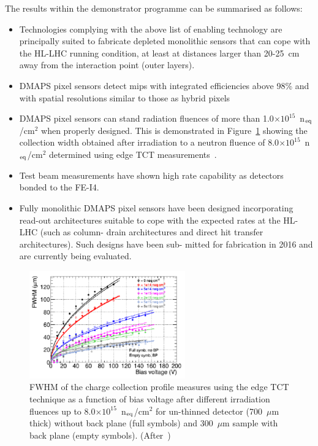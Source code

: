 The results within the demonstrator programme can be summarised as follows:
\begin{itemize}
\item Technologies complying with the above list of enabling technology are principally suited to fabricate depleted monolithic sensors that can cope with the HL-LHC running condition, at least at distances larger than 20-25~cm away from the interaction point (outer layers).
\item DMAPS pixel sensors detect mips with integrated efficiencies above 98\% 
and with spatial resolutions similar to those as hybrid pixels 
\item DMAPS pixel sensors can stand radiation fluences of more than 1.0$\times10^{15}$~n$_{\rm eq}$/cm$^2$ when properly designed. This is demonstrated in Figure~\ref{fig:Eff_DMAPS} showing the 
collection width obtained after irradiation to a neutron fluence of 8.0$\times10^{15}$~n$_{\rm eq}$/cm$^2$ 
determined using
edge TCT measurements~\cite{1748-0221-12-02-P02021,5402213}.
\item  Test beam measurements have shown high rate capability as detectors bonded to the FE-I4.
\item Fully monolithic DMAPS pixel sensors have been designed incorporating read-out architectures suitable to cope with the expected rates at the HL-LHC (such as column- drain architectures and direct hit transfer architectures). Such designs have been sub- mitted for fabrication in 2016 and are currently being evaluated.
\end{itemize}

\begin{figure}[!htbp]
   \centering
   \includegraphics[width=0.6\textwidth]{Eff_DMAPS.pdf}
   \caption{\label{fig:Eff_DMAPS}FWHM of the charge collection profile measures using the edge TCT 
   technique  as a function of bias voltage after 
   different irradiation fluences up to 8.0$\times10^{15}$~n$_{\rm eq}$/cm$^2$ for un-thinned detector 
   (700~$\mu$m thick) without back plane (full symbols) and 300~$\mu$m
    sample with back plane
(empty symbols). 
(After~\cite{1748-0221-12-02-P02021})}
\end{figure}

